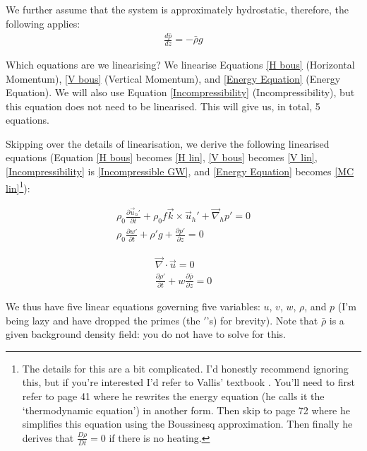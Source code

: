 We further assume that the system is approximately hydrostatic, therefore, the following applies:
\begin{align*}
    \frac{d\bar{p}}{dz}=-\bar{\rho}g
\end{align*}

Which equations are we linearising? We linearise Equations \ref{H bous} (Horizontal Momentum), \ref{V bous} (Vertical Momentum), and \ref{Energy Equation} (Energy Equation). We will also use Equation \ref{Incompressibility} (Incompressibility), but this equation does not need to be linearised. This will give us, in total, 5 equations.

Skipping over the details of linearisation, we derive the following linearised equations (Equation \ref{H bous} becomes \ref{H lin}, \ref{V bous} becomes \ref{V lin}, \ref{Incompressibility} is \ref{Incompressible GW}, and \ref{Energy Equation} becomes \ref{MC lin}\footnote{
    The details for this are a bit complicated. I'd honestly recommend ignoring this, but if you're interested I'd refer to Vallis' textbook \cite{Vallis}. You'll need to first refer to page 41 where he rewrites the energy equation (he calls it the `thermodynamic equation') in another form. Then skip to page 72 where he simplifies this equation using the Boussinesq approximation. Then finally he derives that $\frac{D\rho}{Dt}=0$ if there is no heating.
 }):

\begin{minipage}{0.48\linewidth}
    \begin{align}
        \label{H lin}
        \boxed{\rho_0\frac{\partial \vec{u}_h'}{\partial t}+\rho_0 f\vec{k}\times\vec{u}_h' +\vec{\nabla}_h p' =0}
        \\
        \label{V lin}
        \boxed{\rho_0 \frac{\partial w'}{\partial t} + \rho' g +\frac{\partial p'}{\partial z}=0}
    \end{align}
\end{minipage}
\hfill
\begin{minipage}{0.48\linewidth}
    \begin{align}
        \label{Incompressible GW}
        \boxed{\vec{\nabla}\cdot\vec{u}=0}
        \\
        \label{MC lin}
        \boxed{\frac{\partial \rho'}{\partial t} + w \frac{\partial \bar{\rho}}{\partial z}=0}
    \end{align}
\end{minipage}

\vspace{2mm} We thus have five linear equations governing five variables: $u$, $v$, $w$, $\rho$, and $p$ (I'm being lazy and have dropped the primes (the $'$'s) for brevity). Note that $\bar{\rho}$ is a given background density field: you do not have to solve for this.


